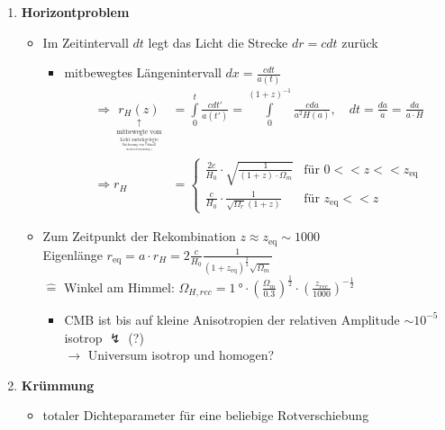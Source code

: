 \begin{itemize}
		\begin{enumerate}[label={(\arabic*)}]
			\item \textbf{Horizontproblem}
				\begin{itemize}[label={$\to$}]
					\item Im Zeitintervall $dt$ legt das Licht die Strecke $dr=cdt$ zurück
						\begin{itemize}[label={$\Rightarrow$}]
							\item mitbewegtes Längenintervall $dx=\frac{cdt}{a(t)}$
								\begin{align*}
									\Rightarrow\ \underset{\underset{\underset{\underset{\underset{\text{bis zur Rotverschiebung } z}{\text{Entfernung von Urknall}}}{\text{Licht zurückgelegte}}}{\text{mitbewegte vom}}}{\uparrow}}{r_H(z)}&=\int\limits_0^t\frac{cdt'}{a(t')}=\int\limits_0^{(1+z)^{-1}}\frac{cda}{a^2 H(a)},\quad dt=\frac{da}{\dot{a}}=\frac{da}{a\cdot H}\\
									\Rightarrow r_H&=\begin{cases} \frac{2c}{H_0}\cdot\sqrt{\frac{1}{(1+z)\cdot\Omega_m}} & \text{für }0<<z<<z_\text{eq}\\ \frac{c}{H_0}\cdot\frac{1}{\sqrt{\Omega_r}(1+z)} & \text{für }z_\text{eq}<<z\end{cases}
								\end{align*}
						\end{itemize}
					\item Zum Zeitpunkt der Rekombination $z\approx z_\text{eq}\sim 1000$\\
						Eigenlänge $r_\text{eq}=a\cdot r_H=2\frac{c}{H_0}\frac{1}{(1+z_\text{eq})^{\frac{3}{2}}\sqrt{\Omega_m}}$\\
						$\hat{=}$ Winkel am Himmel: $\Omega_{H,rec}=\SI{1}{\degree}\cdot\left(\frac{\Omega_m}{\num{0.3}}\right)^{\frac{1}{2}}\cdot\left(\frac{z_{rec}}{1000}\right)^{-\frac{1}{2}}$
						\begin{itemize}[label={$\Rightarrow$}]
							\item CMB ist bis auf kleine Anisotropien der relativen Amplitude $\sim 10^{-5}$ isotrop $\lightning$ (?)\\
								$\to$ Universum isotrop und homogen?
						\end{itemize}
				\end{itemize}
			\item \textbf{Krümmung}
				\begin{itemize}[label={$\to$}]
					\item totaler Dichteparameter für eine beliebige Rotverschiebung

\end{itemize}
\end{enumerate}
\end{itemize}
